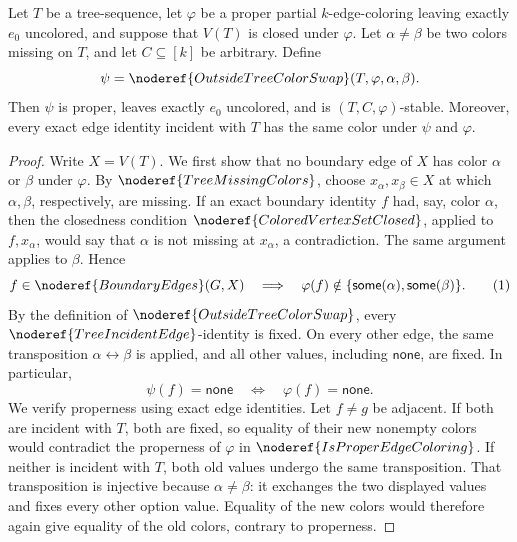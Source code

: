 \begin{lemma}
Let \(T\) be a tree-sequence, let \(\varphi\) be a proper partial
\(k\)-edge-coloring leaving exactly \(e_0\) uncolored, and suppose that
\(V(T)\) is closed under \(\varphi\).  Let \(\alpha\ne\beta\) be two
colors missing on \(T\), and let \(C\subseteq[k]\) be arbitrary.  Define
\[
 \psi=\noderef{OutsideTreeColorSwap}(T,\varphi,\alpha,\beta).
\]
Then \(\psi\) is proper, leaves exactly \(e_0\) uncolored, and is
\((T,C,\varphi)\)-stable.  Moreover, every exact edge identity incident
with \(T\) has the same color under \(\psi\) and \(\varphi\).
\end{lemma}
\begin{proof}
Write \(X=V(T)\).  We first show that no boundary edge of \(X\) has color
\(\alpha\) or \(\beta\) under \(\varphi\).  By
\(\noderef{TreeMissingColors}\), choose \(x_\alpha,x_\beta\in X\) at
which \(\alpha,\beta\), respectively, are missing.  If an exact boundary
identity \(f\) had, say, color \(\alpha\), then the closedness condition
\(\noderef{ColoredVertexSetClosed}\), applied to \(f,x_\alpha\), would
say that \(\alpha\) is not missing at \(x_\alpha\), a contradiction.
The same argument applies to \(\beta\).  Hence
\[
 f\in\noderef{BoundaryEdges}(G,X)
 \quad\Longrightarrow\quad
 \varphi(f)\notin\{\mathsf{some}(\alpha),
                       \mathsf{some}(\beta)\}.                 \tag{1}
\]
By the definition of \(\noderef{OutsideTreeColorSwap}\), every
\(\noderef{TreeIncidentEdge}\)-identity is fixed.  On every other edge,
the same transposition \(\alpha\leftrightarrow\beta\) is applied, and
all other values, including \(\mathsf{none}\), are fixed.  In particular,
\[
 \psi(f)=\mathsf{none}\quad\Longleftrightarrow\quad
 \varphi(f)=\mathsf{none}.                                   \tag{2}
\]
We verify properness using exact edge identities.  Let \(f\ne g\) be
adjacent.  If both are incident with \(T\), both are fixed, so equality
of their new nonempty colors would contradict the properness of
\(\varphi\) in \(\noderef{IsProperEdgeColoring}\).  If neither is
incident with \(T\), both old values undergo the same transposition.
That transposition is injective because \(\alpha\ne\beta\): it exchanges
the two displayed values and fixes every other option value.  Equality of
the new colors would therefore again give equality of the old colors,
contrary to properness.


\end{proof}
